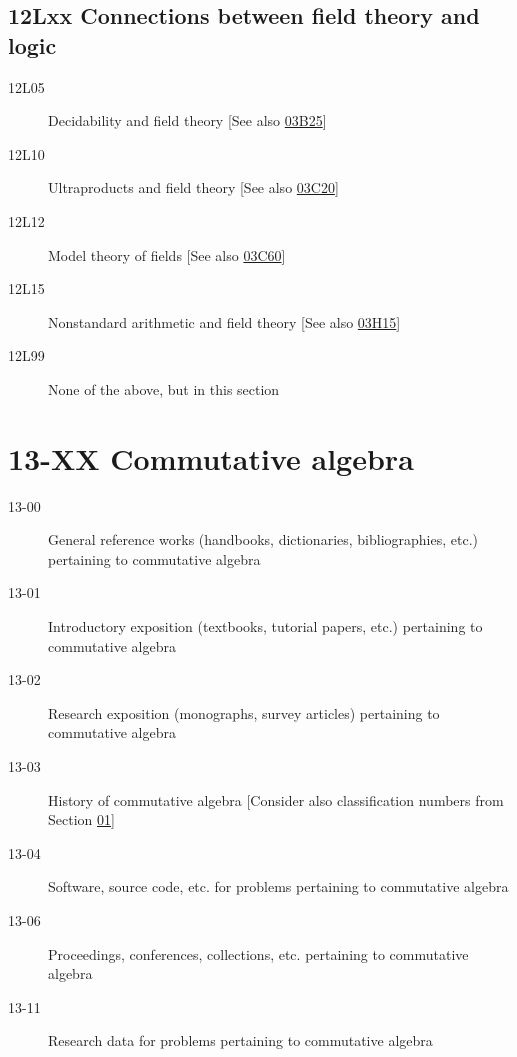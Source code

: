 \subsection*{12Lxx  Connections between field theory and logic}\label{12Lxx}
\begin{description}  
\item [12L05]\label{12L05} Decidability and field theory [See also \hyperref[03B25]{03B25}]
\item [12L10]\label{12L10} Ultraproducts and field theory [See also \hyperref[03C20]{03C20}]
\item [12L12]\label{12L12} Model theory of fields [See also \hyperref[03C60]{03C60}]
\item [12L15]\label{12L15} Nonstandard arithmetic and field theory [See also \hyperref[03H15]{03H15}]
\item [12L99]\label{12L99} None of the above, but in this section
\end{description}     
\section*{13-XX Commutative algebra }\label{13-XX}
\begin{description}          
\item [13-00]\label{13-00} General reference works (handbooks, dictionaries, bibliographies, etc.) pertaining to commutative algebra
\item [13-01]\label{13-01} Introductory exposition (textbooks, tutorial papers, etc.) pertaining to commutative algebra
\item [13-02]\label{13-02} Research exposition (monographs, survey articles) pertaining to commutative algebra
\item [13-03]\label{13-03} History of commutative algebra [Consider also classification numbers from Section \hyperref[01-XX]{01}]
\item [13-04]\label{13-04} Software, source code, etc. for problems pertaining to commutative algebra
\item [13-06]\label{13-06} Proceedings, conferences, collections, etc. pertaining to commutative algebra
\item [13-11]\label{13-11} Research data for problems pertaining to commutative algebra
\end{description}          
